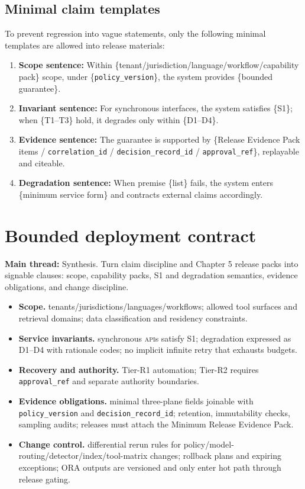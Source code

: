 \documentclass[11pt,a4paper]{report}
\begin{document}
\subsection{Minimal claim templates}
To prevent regression into vague statements, only the following minimal templates are allowed into release materials:
\begin{enumerate}
  \item \textbf{Scope sentence:} Within \{tenant/jurisdiction/language/workflow/capability pack\} scope, under \{\texttt{policy\_version}\}, the system provides \{bounded guarantee\}.
  \item \textbf{Invariant sentence:} For synchronous interfaces, the system satisfies \{S1\}; when \{T1--T3\} hold, it degrades only within \{D1--D4\}.
  \item \textbf{Evidence sentence:} The guarantee is supported by \{Release Evidence Pack items / \texttt{correlation\_id} / \texttt{decision\_record\_id} / \texttt{approval\_ref}\}, replayable and citeable.
  \item \textbf{Degradation sentence:} When premise \{list\} fails, the system enters \{minimum service form\} and contracts external claims accordingly.
\end{enumerate}

\section{Bounded deployment contract}
\textbf{Main thread:} Synthesis. Turn claim discipline and Chapter 5 release packs into signable clauses: scope, capability packs, S1 and degradation semantics, evidence obligations, and change discipline.
\begin{itemize}
  \item \textbf{Scope.} tenants/jurisdictions/languages/workflows; allowed tool surfaces and retrieval domains; data classification and residency constraints.
  \item \textbf{Service invariants.} synchronous \textsc{api}s satisfy S1; degradation expressed as D1--D4 with rationale codes; no implicit infinite retry that exhausts budgets.
  \item \textbf{Recovery and authority.} Tier-R1 automation; Tier-R2 requires \texttt{approval\_ref} and separate authority boundaries.
  \item \textbf{Evidence obligations.} minimal three-plane fields joinable with \texttt{policy\_version} and \texttt{decision\_record\_id}; retention, immutability checks, sampling audits; releases must attach the Minimum Release Evidence Pack.
  \item \textbf{Change control.} differential rerun rules for policy/model-routing/detector/index/tool-matrix changes; rollback plans and expiring exceptions; ORA outputs are versioned and only enter hot path through release gating.
\end{itemize}
\end{document}
